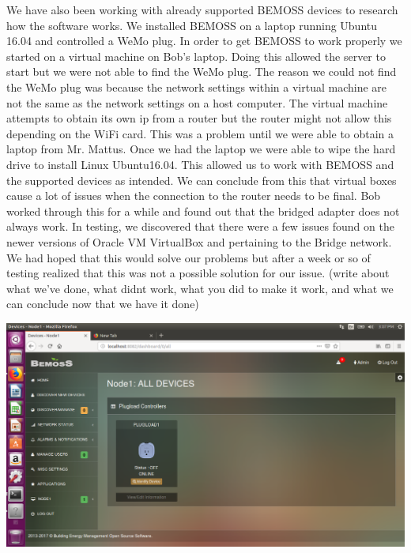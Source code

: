 \documentclass[letterpaper,12pt]{article}   %
\begin{document}
We have also been working with already supported BEMOSS devices to research how the software works. We installed BEMOSS on a laptop running Ubuntu 16.04 and controlled a WeMo plug. In order to get BEMOSS to work properly we started on a virtual machine on Bob's laptop. Doing this allowed the server to start but we were not able to find the WeMo plug. The reason we could not find the WeMo plug was because the network settings within a virtual machine are not the same as the network settings on a host computer. The virtual machine attempts to obtain its own ip from a router but the router might not allow this depending on the WiFi card. This was a problem until we were able to obtain a laptop from Mr. Mattus. 
Once we had the laptop we were able to wipe the hard drive to install Linux Ubuntu16.04. This allowed us to work with BEMOSS and the supported devices as intended. We can conclude from this that virtual boxes cause a lot of issues when the connection to the router needs to be final. Bob worked through this for a while and found out that the bridged adapter does not always work. In testing, we discovered that there were a few issues found on the newer versions of Oracle VM VirtualBox and pertaining to the Bridge network. We had hoped that this would solve our problems but after a week or so of testing realized that this was not a possible solution for our issue. (write about what we've done, what didnt work, what you did to make it work, and what we can conclude now that we have it done)   

\begin{center}
    \includegraphics[width=.68\textwidth, keepaspectratio =true]{figs/img/allDevices.png}
    
\end{center}
\end{document}
